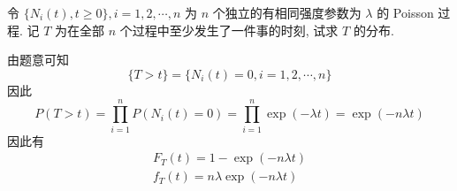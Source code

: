 \documentclass[boxes]{homework}
\begin{document}
\begin{problem}
    令 $\{N_i(t), t\geq 0\}, i = 1,2,\cdots, n$ 为 $n$ 个独立的有相同强度参数为 $\lambda$ 的 Poisson 过程. 记 $T$ 为在全部 $n$ 个过程中至少发生了一件事的时刻, 试求 $T$ 的分布.
\end{problem}
\begin{solution}
    由题意可知
    \begin{equation}
        \{T>t\} = \{N_i(t) = 0, i = 1, 2, \cdots, n\}
    \end{equation}
    因此 
    \begin{equation}
        P(T>t) = \prod_{i = 1}^n P(N_i(t) = 0) = \prod_{i = 1}^n \exp(-\lambda t) = \exp(-n\lambda t)
    \end{equation}
    因此有
    \begin{gather}
        F_T(t) = 1 - \exp(-n\lambda t)\\
        f_T(t) = n\lambda \exp(-n\lambda t)
    \end{gather}
\end{solution}
\end{document}

